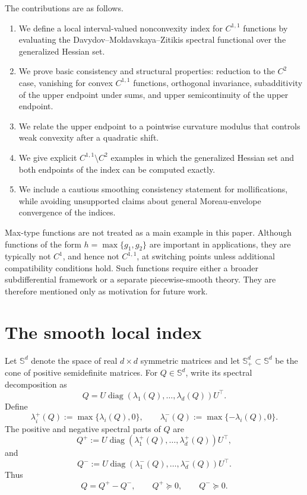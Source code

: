 \documentclass[11pt]{article}
\numberwithin{equation}{section}
\newcommand{\Sd}{\mathbb S^d}
\newcommand{\Spd}{\mathbb S^d_+}
\begin{document}
	The contributions are as follows.
	
	\begin{enumerate}[label=(\roman*)]
		\item We define a local interval-valued nonconvexity index for \(C^{1,1}\) functions by evaluating the Davydov--Moldavskaya--Zitikis spectral functional over the generalized Hessian set.
		\item We prove basic consistency and structural properties: reduction to the \(C^2\) case, vanishing for convex \(C^{1,1}\) functions, orthogonal invariance, subadditivity of the upper endpoint under sums, and upper semicontinuity of the upper endpoint.
		\item We relate the upper endpoint to a pointwise curvature modulus that controls weak convexity after a quadratic shift.
		\item We give explicit \(C^{1,1}\setminus C^2\) examples in which the generalized Hessian set and both endpoints of the index can be computed exactly.
		\item We include a cautious smoothing consistency statement for mollifications, while avoiding unsupported claims about general Moreau-envelope convergence of the indices.
	\end{enumerate}
	
	Max-type functions are not treated as a main example in this paper. Although functions of the form \(h=\max\{g_1,g_2\}\) are important in applications, they are typically not \(C^1\), and hence not \(C^{1,1}\), at switching points unless additional compatibility conditions hold. Such functions require either a broader subdifferential framework or a separate piecewise-smooth theory. They are therefore mentioned only as motivation for future work.
	
	\section{The smooth local index}
	
	Let \(\Sd\) denote the space of real \(d\times d\) symmetric matrices and let \(\Spd\subset\Sd\) be the cone of positive semidefinite matrices. For \(Q\in\Sd\), write its spectral decomposition as
	\[
	Q = U \operatorname{diag}(\lambda_1(Q),\ldots,\lambda_d(Q))U^\top .
	\]
	Define
	\[
	\lambda_i^+(Q):=\max\{\lambda_i(Q),0\},
	\qquad
	\lambda_i^-(Q):=\max\{-\lambda_i(Q),0\}.
	\]
	The positive and negative spectral parts of \(Q\) are
	\[
	Q^+
	:=
	U\operatorname{diag}(\lambda_1^+(Q),\ldots,\lambda_d^+(Q))U^\top,
	\]
	and
	\[
	Q^-
	:=
	U\operatorname{diag}(\lambda_1^-(Q),\ldots,\lambda_d^-(Q))U^\top.
	\]
	Thus
	\[
	Q=Q^+-Q^-,
	\qquad
	Q^+\succeq 0,
	\qquad
	Q^-\succeq 0.
	\]
	
\end{document}
